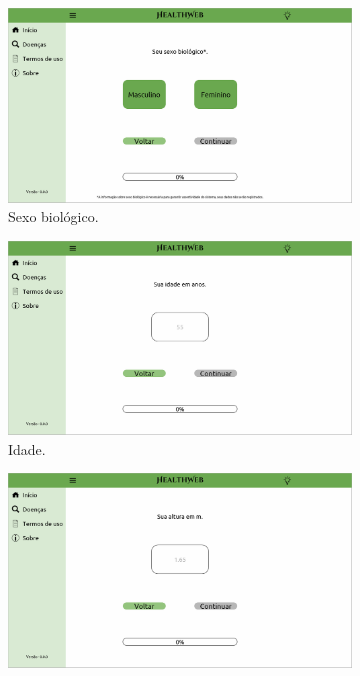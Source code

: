\begin{figure}[htbp]
	\centering
	\begin{subfigure}{0.49\linewidth}
		\centering
		\includegraphics[width=\linewidth]{figure/prototype/desktop/bio_sex.png}
		\caption{Sexo biológico.}
		\label{fig:desktop:bio_sex}
	\end{subfigure}
	\hfill
	\begin{subfigure}{0.49\linewidth}
		\centering
		\includegraphics[width=\linewidth]{figure/prototype/desktop/age.png}
		\caption{Idade.}
		\label{fig:desktop:age}
	\end{subfigure}
	\hfill
	\begin{subfigure}{0.49\linewidth}
		\centering
		\includegraphics[width=\linewidth]{figure/prototype/desktop/height.png}

\end{subfigure}
\end{figure}
